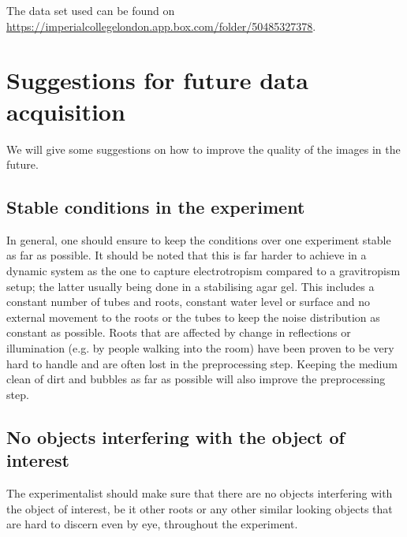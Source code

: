 The data set used can be found on \url{https://imperialcollegelondon.app.box.com/folder/50485327378}.

\section{Suggestions for future data acquisition}\label{futuredataAquis}

We will give some suggestions on how to improve the quality of the images in the future.


\subsection{Stable conditions in the experiment}

In general, one should ensure to keep the conditions over one experiment stable as far as possible. It should be noted that this is far harder to achieve in a dynamic system as the one to capture electrotropism compared to a gravitropism setup; the latter usually being done in a stabilising agar gel. 
This includes a constant number of tubes and roots, constant water level or surface and no external movement to the roots or the tubes to keep the noise distribution as constant as possible. Roots that are affected by change in reflections or illumination (e.g. by people walking into the room) have been proven to be very hard to handle and are often lost in the preprocessing step. 
Keeping the medium clean of dirt and bubbles as far as possible will also improve the preprocessing step. 


\subsection{No objects interfering with the object of interest}

The experimentalist should make sure that there are no objects interfering with the object of interest, be it other roots or any other similar looking objects that are hard to discern even by eye, throughout the experiment.



